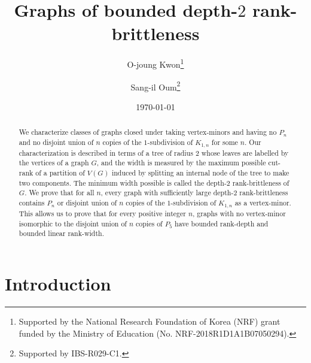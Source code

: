 \documentclass[11pt]{article}
\begin{document}
\title{Graphs of bounded depth-$2$ rank-brittleness}

\author{O-joung Kwon\thanks{Supported by the National Research Foundation of Korea (NRF) grant funded by the Ministry of Education (No. NRF-2018R1D1A1B07050294).}}
\author{Sang-il Oum\thanks{Supported by IBS-R029-C1.}}
\date\today
\maketitle


\begin{abstract}
  We characterize classes of graphs
  closed under taking vertex-minors and 
  having no $P_n$ and no disjoint union of $n$ copies of the $1$-subdivision of $K_{1,n}$ for some $n$.
  Our characterization is described in terms of a tree of radius $2$ whose leaves are labelled by the vertices of  a graph $G$,
  and the width is measured by the maximum possible cut-rank of a partition of $V(G)$ induced by splitting an internal node of the tree to make two components. The minimum width possible is called the depth-$2$ rank-brittleness of $G$.
  We prove that
  for all $n$, every graph with sufficiently large depth-$2$ rank-brittleness
  contains $P_n$ or disjoint union of $n$ copies of the $1$-subdivision of $K_{1,n}$
  as a vertex-minor.
  This allows us to prove that for every positive integer $n$,
  graphs with no vertex-minor isomorphic to the disjoint union of $n$ copies of $P_5$
  have bounded rank-depth and bounded linear rank-width.
\end{abstract}

\section{Introduction}
\end{document}
